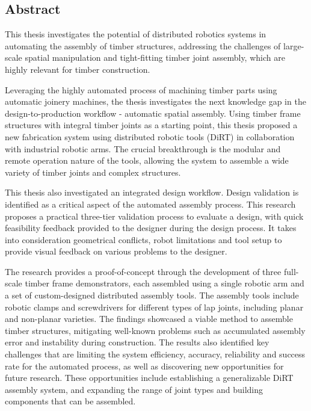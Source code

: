 \begin{adjustwidth}{20mm}{20mm}
\chapter*{Abstract}
This thesis investigates the potential of distributed robotics systems in automating the assembly of timber structures, addressing the challenges of large-scale spatial manipulation and tight-fitting timber joint assembly, which are highly relevant for timber construction.

Leveraging the highly automated process of machining timber parts using automatic joinery machines, the thesis investigates the next knowledge gap in the design-to-production workflow - automatic spatial assembly. Using timber frame structures with integral timber joints as a starting point, this thesis proposed a new fabrication system using distributed robotic tools (DiRT) in collaboration with industrial robotic arms. The crucial breakthrough is the modular and remote operation nature of the tools, allowing the system to assemble a wide variety of timber joints and complex structures.

This thesis also investigated an integrated design workflow. Design validation is identified as a critical aspect of the automated assembly process. This research proposes a practical three-tier validation process to evaluate a design, with quick feasibility feedback provided to the designer during the design process. It takes into consideration geometrical conflicts, robot limitations and tool setup to provide visual feedback on various problems to the designer. 

The research provides a proof-of-concept through the development of three full-scale timber frame demonstrators, each assembled using a single robotic arm and a set of custom-designed distributed assembly tools. The assembly tools include robotic clamps and screwdrivers for different types of lap joints, including planar and non-planar varieties. The findings showcased a viable method to assemble timber structures, mitigating well-known problems such as accumulated assembly error and instability during construction. The results also identified key challenges that are limiting the system efficiency, accuracy, reliability and success rate for the automated process, as well as discovering new opportunities for future research. These opportunities include establishing a generalizable DiRT assembly system, and expanding the range of joint types and building components that can be assembled.


\end{adjustwidth}
